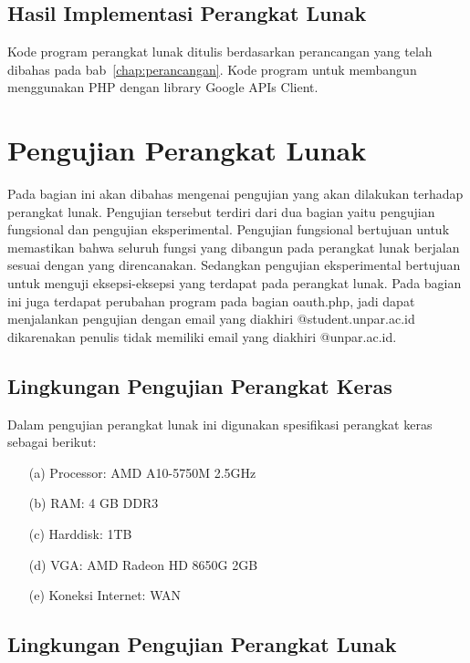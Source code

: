 \subsection{Hasil Implementasi Perangkat Lunak}
\label{sec:hasilimplementasi}

Kode program perangkat lunak ditulis berdasarkan perancangan yang telah dibahas
pada bab~\ref{chap:perancangan}. Kode program untuk membangun  menggunakan PHP
dengan library Google APIs Client.

\section{Pengujian Perangkat Lunak}
\label{sec:pengujianperangkatlunak}

Pada bagian ini akan dibahas mengenai pengujian yang akan dilakukan terhadap
perangkat lunak. Pengujian tersebut terdiri dari dua bagian yaitu pengujian
fungsional dan pengujian eksperimental. Pengujian fungsional bertujuan untuk
memastikan bahwa seluruh fungsi yang dibangun pada perangkat lunak berjalan
sesuai dengan yang direncanakan. Sedangkan pengujian eksperimental bertujuan
untuk menguji eksepsi-eksepsi yang terdapat pada perangkat lunak. Pada bagian
ini juga terdapat perubahan program pada bagian oauth.php, jadi dapat
menjalankan pengujian dengan email yang diakhiri @student.unpar.ac.id
dikarenakan penulis tidak memiliki email yang diakhiri @unpar.ac.id.

\subsection{Lingkungan Pengujian Perangkat Keras}
\label{sec:lingkunganpengujianperangkatkeras}

Dalam pengujian perangkat lunak ini digunakan spesifikasi perangkat keras
sebagai berikut:

\begin{enumerate}
\item[(a)] Processor: AMD A10-5750M 2.5GHz
\item[(b)] RAM: 4 GB DDR3
\item[(c)] Harddisk: 1TB
\item[(d)] VGA: AMD Radeon HD 8650G 2GB
\item[(e)] Koneksi Internet: WAN
\end{enumerate}

\subsection{Lingkungan Pengujian Perangkat Lunak}
\label{sec:lingkunganpengujianperangkatlunak}


